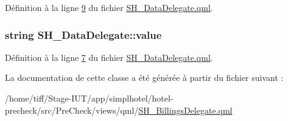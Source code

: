 Définition à la ligne \hyperlink{SH__DataDelegate_8qml_source_l00009}{9} du fichier \hyperlink{SH__DataDelegate_8qml_source}{S\-H\-\_\-\-Data\-Delegate.\-qml}.

\hypertarget{classSH__DataDelegate_acb9da3c73493c88865e08d9575f26482}{
\subsubsection[{value}]{\setlength{\rightskip}{0pt plus 5cm}string S\-H\-\_\-\-Data\-Delegate\-::value\hspace{0.3cm}{\ttfamily [inherited]}}}\label{classSH__DataDelegate_acb9da3c73493c88865e08d9575f26482}


Définition à la ligne \hyperlink{SH__DataDelegate_8qml_source_l00007}{7} du fichier \hyperlink{SH__DataDelegate_8qml_source}{S\-H\-\_\-\-Data\-Delegate.\-qml}.



La documentation de cette classe a été générée à partir du fichier suivant \-:\begin{DoxyCompactItemize}
\item 
/home/tiff/\-Stage-\/\-I\-U\-T/app/simplhotel/hotel-\/precheck/src/\-Pre\-Check/views/qml/\hyperlink{SH__BillingsDelegate_8qml}{S\-H\-\_\-\-Billings\-Delegate.\-qml}\end{DoxyCompactItemize}
